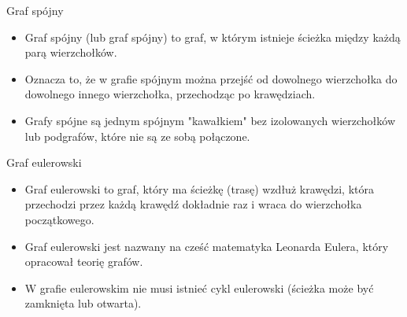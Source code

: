 \documentclass[polish,envcountsect,10pt]{beamer}
\begin{document}
\begin{frame}{Graf spójny}
    \begin{itemize}
        \item Graf spójny (lub graf spójny) to graf, w którym istnieje ścieżka między każdą parą wierzchołków.
        \item Oznacza to, że w grafie spójnym można przejść od dowolnego wierzchołka do dowolnego innego wierzchołka, przechodząc po krawędziach.
        \item Grafy spójne są jednym spójnym "kawałkiem" bez izolowanych wierzchołków lub podgrafów, które nie są ze sobą połączone.
    \end{itemize}
    \begin{center}
    \end{center}
\end{frame}

\begin{frame}{Graf eulerowski}
    \begin{itemize}
        \item Graf eulerowski to graf, który ma ścieżkę (trasę) wzdłuż krawędzi, która przechodzi przez każdą krawędź dokładnie raz i wraca do wierzchołka początkowego.
        \item Graf eulerowski jest nazwany na cześć matematyka Leonarda Eulera, który opracował teorię grafów.
        \item W grafie eulerowskim nie musi istnieć cykl eulerowski (ścieżka może być zamknięta lub otwarta).
    \end{itemize}
    \begin{center}
    \end{center}
\end{frame}
\end{document}

